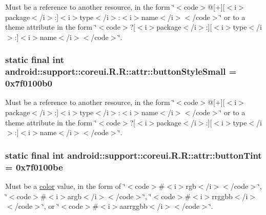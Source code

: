 Must be a reference to another resource, in the form \char`\"{}$<$code$>$@\mbox{[}+\mbox{]}\mbox{[}$<$i$>$package$<$/i$>$:\mbox{]}$<$i$>$type$<$/i$>$:$<$i$>$name$<$/i$>$$<$/code$>$\char`\"{} or to a theme attribute in the form \char`\"{}$<$code$>$?\mbox{[}$<$i$>$package$<$/i$>$:\mbox{]}\mbox{[}$<$i$>$type$<$/i$>$:\mbox{]}$<$i$>$name$<$/i$>$$<$/code$>$\char`\"{}. \hypertarget{classandroid_1_1support_1_1coreui_1_1_r_1_1attr_85cee6d6d96d0c9d0a388c1740ecc8eb}{
\subsubsection[{buttonStyleSmall}]{\setlength{\rightskip}{0pt plus 5cm}static final int android::support::coreui.R.R::attr::buttonStyleSmall = 0x7f0100b0}}
\label{classandroid_1_1support_1_1coreui_1_1_r_1_1attr_85cee6d6d96d0c9d0a388c1740ecc8eb}


Must be a reference to another resource, in the form \char`\"{}$<$code$>$@\mbox{[}+\mbox{]}\mbox{[}$<$i$>$package$<$/i$>$:\mbox{]}$<$i$>$type$<$/i$>$:$<$i$>$name$<$/i$>$$<$/code$>$\char`\"{} or to a theme attribute in the form \char`\"{}$<$code$>$?\mbox{[}$<$i$>$package$<$/i$>$:\mbox{]}\mbox{[}$<$i$>$type$<$/i$>$:\mbox{]}$<$i$>$name$<$/i$>$$<$/code$>$\char`\"{}. \hypertarget{classandroid_1_1support_1_1coreui_1_1_r_1_1attr_997f82e6943cacd71c0e76fb34d6b2ea}{
\subsubsection[{buttonTint}]{\setlength{\rightskip}{0pt plus 5cm}static final int android::support::coreui.R.R::attr::buttonTint = 0x7f0100be}}
\label{classandroid_1_1support_1_1coreui_1_1_r_1_1attr_997f82e6943cacd71c0e76fb34d6b2ea}


Must be a \hyperlink{classandroid_1_1support_1_1coreui_1_1_r_1_1color}{color} value, in the form of \char`\"{}$<$code$>$\#$<$i$>$rgb$<$/i$>$$<$/code$>$\char`\"{}, \char`\"{}$<$code$>$\#$<$i$>$argb$<$/i$>$$<$/code$>$\char`\"{}, \char`\"{}$<$code$>$\#$<$i$>$rrggbb$<$/i$>$$<$/code$>$\char`\"{}, or \char`\"{}$<$code$>$\#$<$i$>$aarrggbb$<$/i$>$$<$/code$>$\char`\"{}. 

